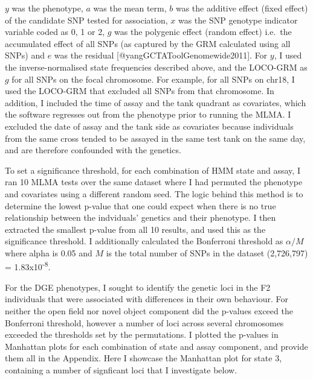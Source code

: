 \documentclass[
]{article}
\begin{document}
\(y\) was the phenotype, \(a\) was the mean term, \(b\) was the additive effect (fixed effect) of the candidate SNP tested for association, \(x\) was the SNP genotype indicator variable coded as 0, 1 or 2, \(g\) was the polygenic effect (random effect) i.e.~the accumulated effect of all SNPs (as captured by the GRM calculated using all SNPs) and \(e\) was the residual {[}@yangGCTAToolGenomewide2011{]}. For \(y\), I used the inverse-normalised state frequencies described above, and the LOCO-GRM as \(g\) for all SNPs on the focal chromosome. For example, for all SNPs on chr18, I used the LOCO-GRM that excluded all SNPs from that chromosome. In addition, I included the time of assay and the tank quadrant as covariates, which the software regresses out from the phenotype prior to running the MLMA. I excluded the date of assay and the tank side as covariates because individuals from the same cross tended to be assayed in the same test tank on the same day, and are therefore confounded with the genetics.

To set a significance threshold, for each combination of HMM state and assay, I ran 10 MLMA tests over the same dataset where I had permuted the phenotype and covariates using a different random seed. The logic behind this method is to determine the lowest p-value that one could expect when there is no true relationship between the indviduals' genetics and their phenotype. I then extracted the smallest p-value from all 10 results, and used this as the significance threshold. I additionally calculated the Bonferroni threshold as \(\alpha / M\) where alpha is 0.05 and \(M\) is the total number of SNPs in the dataset (2,726,797) = 1.83x10\textsuperscript{-8}.

For the DGE phenotypes, I sought to identify the genetic loci in the F2 individuals that were associated with differences in their own behaviour. For neither the open field nor novel object component did the p-values exceed the Bonferroni threshold, however a number of loci across several chromosomes exceeded the thresholds set by the permutations. I plotted the p-values in Manhattan plots for each combination of state and assay component, and provide them all in the Appendix. Here I showcase the Manhattan plot for state 3, containing a number of signficant loci that I investigate below.
\end{document}
